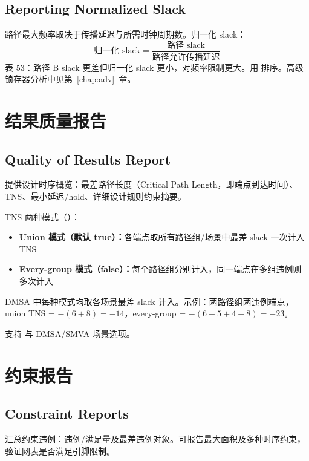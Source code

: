 \subsection*{Reporting Normalized Slack}

路径最大频率取决于传播延迟与所需时钟周期数。归一化 slack：
\[
\text{归一化 slack} = \frac{\text{路径 slack}}{\text{路径允许传播延迟}}
\]
表 53：路径 B slack 更差但归一化 slack 更小，对频率限制更大。用  排序。高级锁存器分析中见第~\ref{chap:adv}~章。

\section{结果质量报告}
\subsection*{Quality of Results Report}

 提供设计时序概览：最差路径长度（Critical Path Length，即端点到达时间）、TNS、最小延迟/hold、详细设计规则约束摘要。

TNS 两种模式（）：
\begin{itemize}
  \item \textbf{Union 模式（默认 true）：}各端点取所有路径组/场景中最差 slack 一次计入 TNS
  \item \textbf{Every-group 模式（false）：}每个路径组分别计入，同一端点在多组违例则多次计入
\end{itemize}

DMSA 中每种模式均取各场景最差 slack 计入。示例：两路径组两违例端点，union TNS = $-(6+8)=-14$，every-group = $-(6+5+4+8)=-23$。

 支持  与 DMSA/SMVA 场景选项。

\section{约束报告}
\subsection*{Constraint Reports}

 汇总约束违例：违例/满足量及最差违例对象。可报告最大面积及多种时序约束，验证网表是否满足引脚限制。

